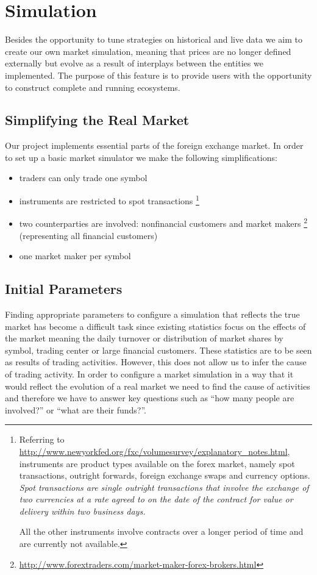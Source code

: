 
\section{Simulation}
Besides the opportunity to tune strategies on historical and live data we aim to
create our own market simulation, meaning that prices are no longer defined
externally but evolve as a result of interplays between the entities we implemented.
The purpose of this feature is to provide users with the opportunity to construct
complete and running ecosystems.

\subsection{Simplifying the Real Market}
Our project implements essential parts of the foreign exchange market.
In order to set up a basic market simulator we make the following
simplifications:

\begin{itemize}
  \item traders can only trade one symbol
  \item instruments are restricted to spot transactions
    \footnote{Referring to \url{http://www.newyorkfed.org/fxc/volumesurvey/explanatory_notes.html},
    instruments
    are product types available on the forex market, namely spot transactions, outright
    forwards, foreign exchange swaps and currency options. \textit{Spot transactions are single
    outright transactions that involve the exchange of two currencies at a rate agreed
    to on the date of the contract for value or delivery within two business days.}

    All the other instruments involve contracts over a longer period of time and are
    currently not available.}


  \item two counterparties are involved: nonfinancial customers and market makers
    \footnote{\url{http://www.forextraders.com/market-maker-forex-brokers.html}}
    (representing all financial customers)
  \item one market maker per symbol
\end{itemize}

\subsection{Initial Parameters}
Finding appropriate parameters to configure a simulation that reflects the
true market has become a difficult task since existing statistics focus on
the effects of the market meaning the daily turnover or distribution of market
shares by symbol, trading center or large financial customers. These statistics
are to be seen as results of trading activities. However, this does not allow
us to infer the cause of trading activity. In order to configure a market
simulation in a way that it would reflect the evolution of a real market we
need to find the cause of activities and therefore we have to answer key questions
such as ``how many people are involved?'' or ``what are their funds?''.

